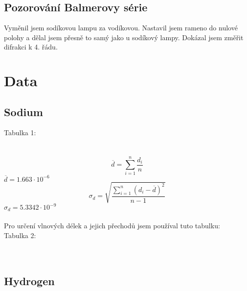 \documentclass{article}
\begin{document}
\subsection{Pozorování Balmerovy série}
Vyměnil jsem sodíkovou lampu za vodíkovou.
Nastavil jsem rameno do nulové polohy a dělal jsem přesně to samý jako u sodíkový lampy.
Dokázal jsem změřit difrakci k 4. řádu.
\section{Data}
\subsection{Sodium}
\footnotesize{Tabulka 1:}\\
\large{
\\
}
\vspace{1em}
\\
$$\overline{d} = \sum^{n}_{i=1}\frac{d_{i}}{n}$$
$\overline{d} = 1.663 \cdot 10^{-6}$\\

$$\sigma_{d} = \sqrt{\frac{\sum^{n}_{i=1}(d_{i} - \overline{d})^{2}}{n-1}}$$
$\sigma_{d} = 5.3342 \cdot 10^{-9}$
\\
\vspace{1em}
\\
Pro určení vlnových délek a jejich přechodů jsem používal tuto tabulku:\\
\footnotesize{Tabulka 2:}\\
\large{
\\
}
\vspace{1em}
\\
\subsection{Hydrogen}
\section{}
\section{}
\section{}
\section{}
\end{document}
